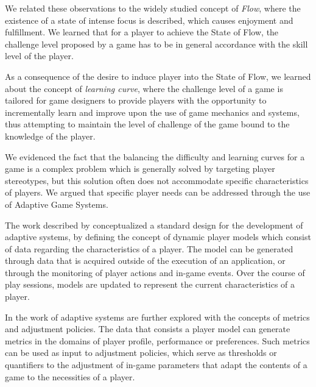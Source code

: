 We related these observations to the widely studied concept of \emph{Flow}, where the existence of a state of intense focus is described, which causes enjoyment and fulfillment. We learned that for a player to achieve the State of Flow, the challenge level proposed by a game has to be in general accordance with the skill level of the player.

As a consequence of the desire to induce player into the State of Flow, we learned about the concept of \emph{learning curve}, where the challenge level of a game is tailored for game designers to provide players with the opportunity to incrementally learn and improve upon the use of game mechanics and systems, thus attempting to maintain the level of challenge of the game bound to the knowledge of the player.

We evidenced the fact that the balancing the difficulty and learning curves for a game is a complex problem which is generally solved by targeting player stereotypes, but this solution often does not accommodate specific characteristics of players. We argued that specific player needs can be addressed through the use of Adaptive Game Systems.

The work described by \citet{ARTICLE_PlayerCentredGameDesign} conceptualized a standard design for the development of adaptive systems, by defining the concept of dynamic player models which consist of data regarding the characteristics of a player. The model can be generated through data that is acquired outside of the execution of an application, or through the monitoring of player actions and in-game events. Over the course of play sessions, models are updated to represent the current characteristics of a player.

In the work of \citet{PHD_DynamicDifficultyAdjustment} adaptive systems are further explored with the concepts of metrics and adjustment policies. The data that consists a player model can generate metrics in the domains of player profile, performance or preferences. Such metrics can be used as input to adjustment policies, which serve as thresholds or quantifiers to the adjustment of in-game parameters that adapt the contents of a game to the necessities of a player.


